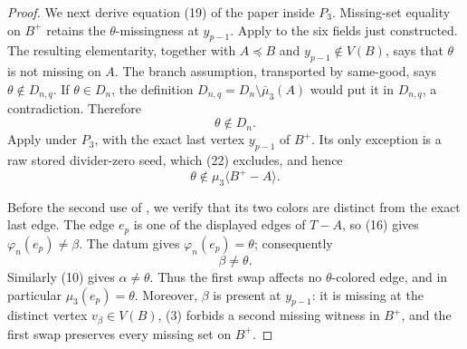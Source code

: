 \begin{proof}
We next derive equation (19) of the paper inside \(P_3\).  Missing-set
equality on \(B^+\) retains the \(\theta\)-missingness at
\(y_{p-1}\).  Apply
 to the six fields
just constructed.  The resulting elementarity, together with
\(A\preccurlyeq B\) and \(y_{p-1}\notin V(B)\), says that \(\theta\)
is not missing on \(A\).  The branch assumption, transported by
same-good, says \(\theta\notin D_{n,q}\).  If \(\theta\in D_n\), the
definition \(D_{n,q}=D_n\setminus\overline\mu_3(A)\) would put it in
\(D_{n,q}\), a contradiction.  Therefore
\[
                        \theta\notin D_n.                    \tag{22}
\]
Apply  under \(P_3\), with
the exact last vertex \(y_{p-1}\) of \(B^+\).  Its only exception is a
raw stored divider-zero seed, which (22) excludes, and hence
\[
             \theta\notin\mu_3\langle B^+-A\rangle.          \tag{23}
\]

Before the second use of , we verify that its two
colors are distinct from the exact last edge.  The edge \(e_p\) is one
of the displayed edges of \(T-A\), so (16) gives
\(\varphi_n(e_p)\ne\beta\).  The datum gives
\(\varphi_n(e_p)=\theta\); consequently
\[
                         \beta\ne\theta.                    \tag{24}
\]
Similarly (10) gives \(\alpha\ne\theta\).  Thus the first swap affects
no \(\theta\)-colored edge, and in particular
\(\mu_3(e_p)=\theta\).  Moreover, \(\beta\) is present at
\(y_{p-1}\): it is missing at the distinct vertex
\(v_\beta\in V(B)\), (3) forbids a second missing witness in \(B^+\),
and the first swap preserves every missing set on \(B^+\).


\end{proof}
